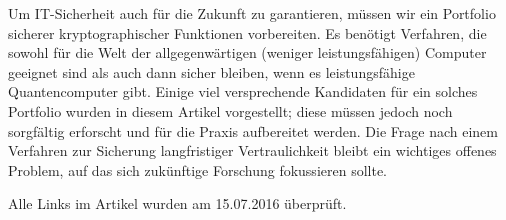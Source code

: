 \begin{refsegment}
Um IT-Sicherheit auch für die Zukunft zu garantieren, müssen wir ein
Portfolio sicherer kryptographischer Funktionen vorbereiten. Es benötigt
Verfahren, die sowohl für die Welt der allgegenwärtigen (weniger
leistungsfähigen) Computer geeignet sind als auch dann sicher bleiben,
wenn es leistungsfähige Quantencomputer gibt.
Einige viel versprechende
Kandidaten für ein solches Portfolio wurden in diesem Artikel
vorgestellt; diese müssen jedoch noch sorgfältig erforscht und für die
Praxis aufbereitet werden. Die Frage nach einem Verfahren zur Sicherung
langfristiger Vertraulichkeit bleibt ein wichtiges offenes Problem, auf
das sich zukünftige Forschung fokussieren sollte.


\printbibliography[%
	heading=subbibintoc,
	title={Literatur zu Kapitel \thechapter},
	segment=\therefsegment,
]


\noindent Alle Links im Artikel wurden am 15.07.2016 überprüft.

\end{refsegment}
